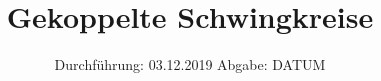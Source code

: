 
\usepackage{physics}
\subject{VERSUCH NUMMER}
\title{Gekoppelte Schwingkreise}
\date{%
  Durchführung: 03.12.2019
  \hspace{3em}
  Abgabe: DATUM
}




\maketitle
\thispagestyle{empty}
\tableofcontents
\newpage
\nocite{V355}






\printbibliography{}


